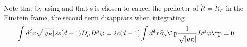 Note that by using  and that s is chosen to cancel the prefactor of $\tilde R= R_E$ in the Einstein frame, the second term disappears when integrating
\begin{equation}      
\int d^dx \sqrt{|g_E|} 2s(d-1)D_\mu D^\mu\varphi = 2s(d-1)\int d^dx \partial_\mu\lp\frac{1}{\sqrt{|g_E|}}D^\mu\varphi\rp = 0   
\end{equation}


